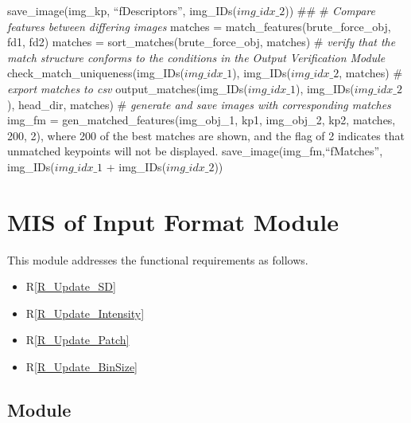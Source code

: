 \documentclass[12pt, titlepage]{article}
\begin{document}
save\_image(img\_kp, ``fDescriptors'', img\_IDs($img\_idx\_{2}$))\newline \newline
\#\# \newline \newline
\# \textit{Compare features between differing images} \newline 
matches = match\_features(brute\_force\_obj, fd1, fd2) \newline
matches = sort\_matches(brute\_force\_obj, matches) \newline \newline
\# \textit{verify that the match structure conforms to the conditions in the
Output Verification Module} \newline 
check\_match\_uniqueness(img\_IDs($img\_idx\_{1}$), img\_IDs($img\_idx\_{2}$, matches)\newline \newline
\# \textit{export matches to csv} \newline
output\_matches(img\_IDs($img\_idx\_{1}$), img\_IDs($img\_idx\_{2}$), head\_dir, matches) \newline \newline
\# \textit{generate and save images with corresponding matches} \newline
img\_fm = gen\_matched\_features(img\_obj\_1, kp1, img\_obj\_2, kp2, matches, 200, 2), where 200 of the best matches are shown,
and the flag of 2 indicates that unmatched keypoints will not be displayed.\newline
save\_image(img\_fm,``fMatches'', img\_IDs($img\_idx\_{1}$ + img\_IDs($img\_idx\_{2}$))


\section{MIS of Input Format Module} \label{mIF}
This module addresses the functional requirements as follows.
\begin{itemize}
  \item R\ref{R_Update_SD}
  \item R\ref{R_Update_Intensity}
  \item R\ref{R_Update_Patch}
  \item R\ref{R_Update_BinSize}
\end{itemize}
\subsection{Module}
\end{document}
